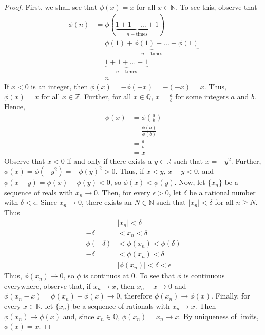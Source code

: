 \documentclass[12pt,leqno]{article}
\numberwithin{equation}{section}
\theoremstyle{definition}
\begin{document}
\begin{proof}
 First, we shall see that $\phi(x)=x$ for all $x\in\mathbb{N}$. To see this, observe that \begin{align*}\phi(n)&=\phi\left(\underbrace{1+1+\hdots+1}_{n-\text{times}}\right)\\&=\underbrace{\phi(1)+\phi(1)+\hdots+\phi(1)}_{n-\text{times}}\\&=\underbrace{1+1+\hdots+1}_{n-\text{times}}\\&=n\end{align*} If $x<0$ is an integer, then $\phi(x)=-\phi(-x)=-(-x)=x$. Thus, $\phi(x)=x$ for all $x\in\mathbb{Z}$. Further, for all $x\in\mathbb{Q}$, $x=\frac{a}{b}$ for some integers $a$ and $b$. Hence, \begin{align*}\phi(x)&=\phi\left(\frac{a}{b}\right)\\&=\frac{\phi(a)}{\phi(b)}\\&=\frac{a}{b}\\&=x\end{align*} Observe that $x<0$ if and only if there exists a $y\in\mathbb{R}$ such that $x=-y^2$. Further, $\phi(x)=\phi(-y^2)=-\phi(y)^2>0$. Thus, if $x<y$, $x-y<0$, and $\phi(x-y)=\phi(x)-\phi(y)<0$, so $\phi(x)<\phi(y)$. Now, let $\{x_n\}$ be a sequence of reals with $x_n\to0$. Then, for every $\epsilon>0$, let $\delta$ be a rational number with $\delta<\epsilon$. Since $x_n\to0$, there exists an $N\in\mathbb{N}$ such that $|x_n|<\delta$ for all $n\geq N$. Thus \begin{align*}& |x_n|<\delta\\-\delta&<x_n<\delta\\\phi(-\delta)&<\phi(x_n)<\phi(\delta)\\-\delta&<\phi(x_n)<\delta\\& |\phi(x_n)|<\delta<\epsilon\end{align*} Thus, $\phi(x_n)\to0$, so $\phi$ is continuos at $0$. To see that $\phi$ is continuous everywhere, observe that, if $x_n\to x$, then $x_n-x\to0$ and $\phi(x_n-x)=\phi(x_n)-\phi(x)\to0$, therefore $\phi(x_n)\to\phi(x)$. Finally, for every $x\in\mathbb{R}$, let $\{x_n\}$ be a sequence of rationals with $x_n\to x$. Then $\phi(x_n)\to\phi(x)$ and, since $x_n\in\mathbb{Q}$, $\phi(x_n)=x_n\to x$. By uniqueness of limits, $\phi(x)=x$.
\end{proof}
\end{document}
